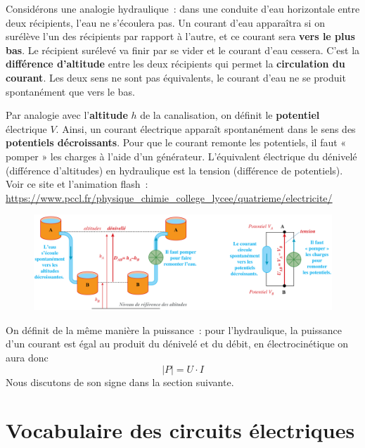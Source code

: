\documentclass[../../main/main.tex]{subfiles}
\begin{document}
Considérons une analogie hydraulique~: dans une conduite d'eau horizontale entre
deux récipients, l'eau ne s'écoulera pas. Un courant d'eau apparaîtra si on
surélève l'un des récipients par rapport à l'autre, et ce courant sera
\textbf{vers le plus bas}. Le récipient surélevé va finir par se vider et le
courant d'eau cessera. C'est la \textbf{différence d'altitude} entre les deux
récipients qui permet la \textbf{circulation du courant}. Les deux sens ne sont
pas équivalents, le courant d'eau ne se produit spontanément que vers le bas.

Par analogie avec l'\textbf{altitude} $h$ de la canalisation, on définit le
\textbf{potentiel} électrique $V$. Ainsi, un courant électrique apparaît
spontanément dans le sens des \textbf{potentiels décroissants}. Pour que le
courant remonte les potentiels, il faut « pomper » les charges à l'aide d'un
générateur. L'équivalent électrique du dénivelé (différence d'altitudes) en
hydraulique est la tension (différence de potentiels). Voir ce site et
l'animation flash~: \href{https://www.pccl.fr/physique\_chimie\_college\_lycee/quatrieme/electricite/analogie\_hydraulique.htm}
{https://www.pccl.fr/physique\_chimie\_college\_lycee/quatrieme/electricite/}

\begin{figure}[h]
	\centering
	\includegraphics[width=\linewidth]{anal_elec-hydro.png}
	\label{fig:anal_elec-hydro}
\end{figure}

On définit de la même manière la puissance~: pour l'hydraulique, la puissance
d'un courant est égal au produit du dénivelé et du débit, en
électrocinétique on aura donc
\[\boxed{\left| P \right| = U\cdot I}\]
Nous discutons de son signe dans la section suivante.

\section{Vocabulaire des circuits électriques}
\end{document}
